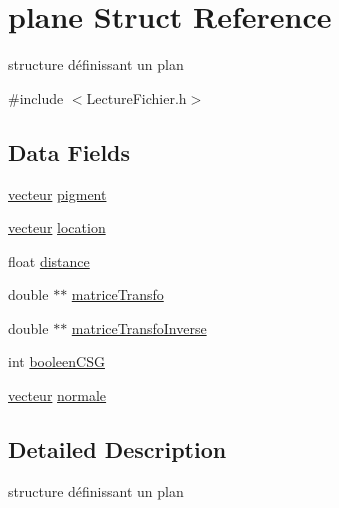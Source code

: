 \hypertarget{structplane}{
\section{plane Struct Reference}
\label{structplane}
}


structure définissant un plan  




{\ttfamily \#include $<$LectureFichier.h$>$}

\subsection*{Data Fields}
\begin{DoxyCompactItemize}
\item 
\hyperlink{structvecteur}{vecteur} \hyperlink{structplane_a5a4ee24431a1811fa1c8b75844198987}{pigment}
\item 
\hyperlink{structvecteur}{vecteur} \hyperlink{structplane_ae655d799d0a983ee8cf5fc840953c404}{location}
\item 
float \hyperlink{structplane_a06f14a9abd47b91465f895d5259cdc1b}{distance}
\item 
double $\ast$$\ast$ \hyperlink{structplane_aa06ccc348007e3355beccf412f2f656c}{matriceTransfo}
\item 
double $\ast$$\ast$ \hyperlink{structplane_acd7a3590501dcccfaefccbb658f83821}{matriceTransfoInverse}
\item 
int \hyperlink{structplane_a4428e32d4383f7dee25e5a4cb192da24}{booleenCSG}
\item 
\hyperlink{structvecteur}{vecteur} \hyperlink{structplane_a944738f40a0294270a0047acc5a77ee2}{normale}
\end{DoxyCompactItemize}


\subsection{Detailed Description}
structure définissant un plan 

